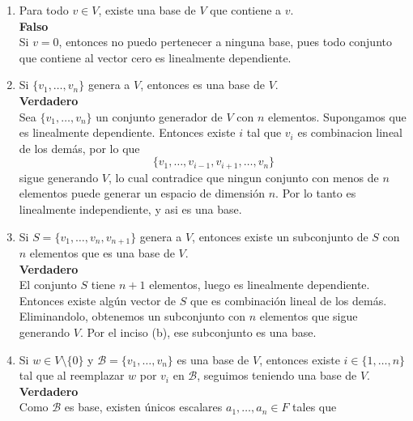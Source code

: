 \documentclass[12pt,a4paper]{article}
\begin{document}
    \begin{solucion}
        \begin{enumerate}
            \item[(a)] Para todo $v\in V$, existe una base de $V$ que contiene a $v$.\\
            \textbf{Falso}\\
            Si $v=0$, entonces no puedo pertenecer a ninguna base, pues todo conjunto que contiene
            al vector cero es linealmente dependiente.
            \item[(b)] Si $\{v_{1},\dots,v_{n}\}$ genera a $V$, entonces es una base de $V$.\\
            \textbf{Verdadero}\\
            Sea $\{v_{1},\dots,v_{n}\}$ un conjunto generador de $V$ con $n$ elementos. Supongamos
            que es linealmente dependiente. Entonces existe $i$ tal que $v_{i}$ es combinacion lineal
            de los demás, por lo que
            \begin{equation*}
                \{v_{1},\dots,v_{i-1},v_{i+1},\dots,v_{n}\}
            \end{equation*}
            sigue generando $V$, lo cual contradice que ningun conjunto con menos de $n$ elementos
            puede generar un espacio de dimensión $n$. Por lo tanto es linealmente independiente,
            y asi es una base.
            \item[(c)] Si $S=\{v_{1},\dots,v_{n},v_{n+1}\}$ genera a $V$, entonces existe un subconjunto de $S$ con $n$ elementos
            que es una base de $V$.\\
            \textbf{Verdadero}\\
            El conjunto $S$ tiene $n+1$ elementos, luego es linealmente dependiente. Entonces existe
            algún vector de $S$ que es combinación lineal de los demás. Eliminandolo, obtenemos un
            subconjunto con $n$ elementos que sigue generando $V$. Por el inciso (b), ese subconjunto
            es una base.
            \item[(d)] Si $w\in V\setminus\{0\}$ y $\mathcal{B}=\{v_{1},\dots,v_{n}\}$ es una base de $V$, entonces
            existe $i\in\{1,\dots,n\}$ tal que al reemplazar $w$ por $v_{i}$ en $\mathcal{B}$, seguimos teniendo una base
            de $V$.\\
            \textbf{Verdadero}\\
            Como $\mathcal{B}$ es base, existen únicos escalares $a_{1},\dots,a_{n}\in F$ tales que
            \begin{equation*}

\end{equation*}
\end{enumerate}
\end{solucion}
\end{document}
